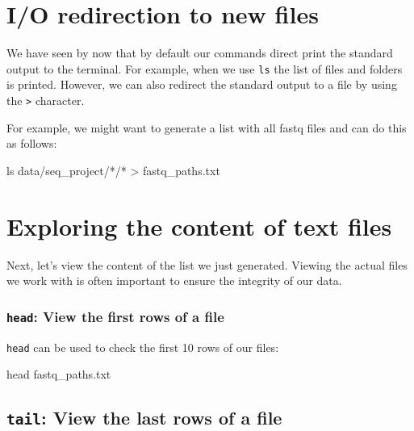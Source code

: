 \documentclass[
  letterpaper,
  DIV=11,
  numbers=noendperiod]{scrreprt}
\newenvironment{Shaded}{}{}
\newcommand{\FunctionTok}[1]{\textcolor[rgb]{0.44,0.26,0.76}{#1}}
\newcommand{\NormalTok}[1]{\textcolor[rgb]{0.14,0.16,0.18}{#1}}
\newcommand{\OperatorTok}[1]{\textcolor[rgb]{0.14,0.16,0.18}{#1}}
\newcommand{\PreprocessorTok}[1]{\textcolor[rgb]{0.84,0.23,0.29}{#1}}
\begin{document}
\section{I/O redirection to new
files}\label{io-redirection-to-new-files}

We have seen by now that by default our commands direct print the
standard output to the terminal. For example, when we use \texttt{ls}
the list of files and folders is printed. However, we can also redirect
the standard output to a file by using the \texttt{\textgreater{}}
character.

For example, we might want to generate a list with all fastq files and
can do this as follows:

\begin{Shaded}
\begin{Highlighting}[]
\FunctionTok{ls}\NormalTok{ data/seq\_project/}\PreprocessorTok{*}\NormalTok{/}\PreprocessorTok{*} \OperatorTok{\textgreater{}}\NormalTok{ fastq\_paths.txt}
\end{Highlighting}
\end{Shaded}

\section{Exploring the content of text
files}\label{exploring-the-content-of-text-files}

Next, let's view the content of the list we just generated. Viewing the
actual files we work with is often important to ensure the integrity of
our data.

\subsubsection{\texorpdfstring{\texttt{head}: View the first rows of a
file}{head: View the first rows of a file}}\label{head-view-the-first-rows-of-a-file}

\texttt{head} can be used to check the first 10 rows of our files:

\begin{Shaded}
\begin{Highlighting}[]
\FunctionTok{head}\NormalTok{ fastq\_paths.txt}
\end{Highlighting}
\end{Shaded}

\subsection{\texorpdfstring{\texttt{tail}: View the last rows of a
file}{tail: View the last rows of a file}}\label{tail-view-the-last-rows-of-a-file}
\end{document}
